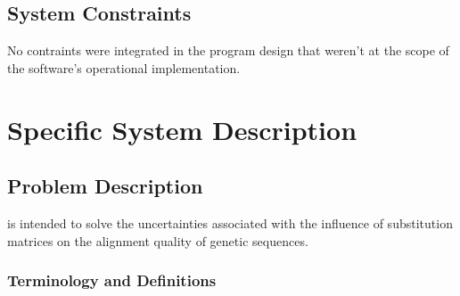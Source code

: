 \documentclass[12pt]{article}
\begin{document}
\subsection{System Constraints}

No contraints were integrated in the program design that weren't at the scope of the 
\progname{} software's operational implementation.

\section{Specific System Description}



\subsection{Problem Description} \label{Sec_pd}

\progname{} is intended to solve the uncertainties associated with the influence of 
substitution matrices on the alignment quality of genetic sequences.

\subsubsection{Terminology and  Definitions}


\end{document}
